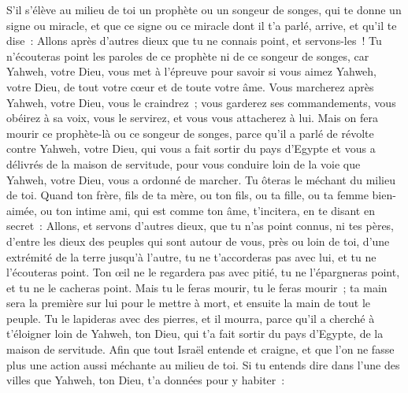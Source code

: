 \begin{multicols}{2}
\VerseOne{}S'il s'élève au milieu de toi un prophète ou un songeur de songes, qui te donne un signe ou miracle,
et que ce signe ou ce miracle dont il t'a parlé, arrive, et qu'il te dise~: Allons après d'autres dieux que tu ne connais point, et servons-les~!
Tu n'écouteras point les paroles de ce prophète ni de ce songeur de songes, car Yahweh, votre Dieu, vous met à l'épreuve pour savoir si vous aimez Yahweh, votre Dieu, de tout votre cœur et de toute votre âme.
Vous marcherez après Yahweh, votre Dieu, vous le craindrez~; vous garderez ses commandements, vous obéirez à sa voix, vous le servirez, et vous vous attacherez à lui.
Mais on fera mourir ce prophète-là ou ce songeur de songes, parce qu'il a parlé de révolte contre Yahweh, votre Dieu, qui vous a fait sortir du pays d'Egypte et vous a délivrés de la maison de servitude, pour vous conduire loin de la voie que Yahweh, votre Dieu, vous a ordonné de marcher. Tu ôteras le méchant du milieu de toi.
Quand ton frère, fils de ta mère, ou ton fils, ou ta fille, ou ta femme bien-aimée, ou ton intime ami, qui est comme ton âme, t'incitera, en te disant en secret~: Allons, et servons d'autres dieux, que tu n'as point connus, ni tes pères,
d'entre les dieux des peuples qui sont autour de vous, près ou loin de toi, d'une extrémité de la terre jusqu'à l'autre,
tu ne t'accorderas pas avec lui, et tu ne l'écouteras point. Ton œil ne le regardera pas avec pitié, tu ne l'épargneras point, et tu ne le cacheras point.
Mais tu le feras mourir, tu le feras mourir~; ta main sera la première sur lui pour le mettre à mort, et ensuite la main de tout le peuple.
Tu le lapideras avec des pierres, et il mourra, parce qu'il a cherché à t'éloigner loin de Yahweh, ton Dieu, qui t'a fait sortir du pays d'Egypte, de la maison de servitude.
Afin que tout Israël entende et craigne, et que l'on ne fasse plus une action aussi méchante au milieu de toi.
Si tu entends dire dans l'une des villes que Yahweh, ton Dieu, t'a données pour y habiter~:

\end{multicols}

